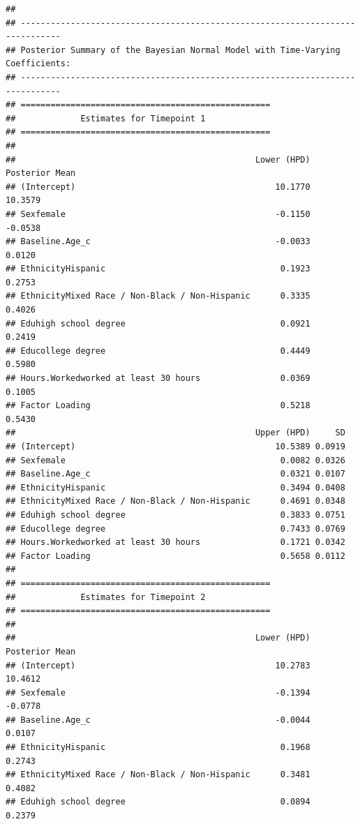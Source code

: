 \documentclass[a4paper, preprint, 3p,
authoryear]{elsarticle} %
\begin{document}
\begin{verbatim}
## 
## ------------------------------------------------------------------------------
## Posterior Summary of the Bayesian Normal Model with Time-Varying Coefficients:
## ------------------------------------------------------------------------------
## ==================================================
##             Estimates for Timepoint 1
## ==================================================
## 
##                                                Lower (HPD) Posterior Mean
## (Intercept)                                        10.1770        10.3579
## Sexfemale                                          -0.1150        -0.0538
## Baseline.Age_c                                     -0.0033         0.0120
## EthnicityHispanic                                   0.1923         0.2753
## EthnicityMixed Race / Non-Black / Non-Hispanic      0.3335         0.4026
## Eduhigh school degree                               0.0921         0.2419
## Educollege degree                                   0.4449         0.5980
## Hours.Workedworked at least 30 hours                0.0369         0.1005
## Factor Loading                                      0.5218         0.5430
##                                                Upper (HPD)     SD
## (Intercept)                                        10.5389 0.0919
## Sexfemale                                           0.0082 0.0326
## Baseline.Age_c                                      0.0321 0.0107
## EthnicityHispanic                                   0.3494 0.0408
## EthnicityMixed Race / Non-Black / Non-Hispanic      0.4691 0.0348
## Eduhigh school degree                               0.3833 0.0751
## Educollege degree                                   0.7433 0.0769
## Hours.Workedworked at least 30 hours                0.1721 0.0342
## Factor Loading                                      0.5658 0.0112
## 
## ==================================================
##             Estimates for Timepoint 2
## ==================================================
## 
##                                                Lower (HPD) Posterior Mean
## (Intercept)                                        10.2783        10.4612
## Sexfemale                                          -0.1394        -0.0778
## Baseline.Age_c                                     -0.0044         0.0107
## EthnicityHispanic                                   0.1968         0.2743
## EthnicityMixed Race / Non-Black / Non-Hispanic      0.3481         0.4082
## Eduhigh school degree                               0.0894         0.2379

\end{verbatim}
\end{document}

